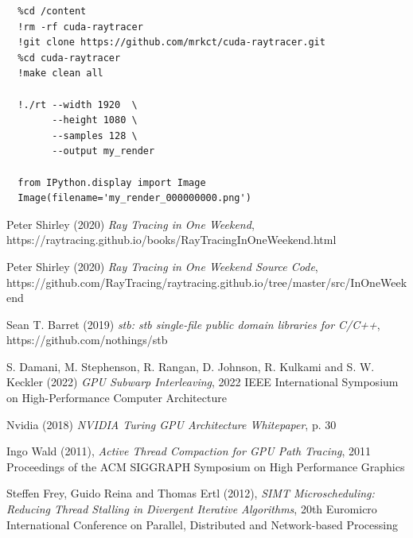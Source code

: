 \documentclass[12pt, twoside]{article}
\begin{document}
\begin{lstlisting}
  %cd /content
  !rm -rf cuda-raytracer
  !git clone https://github.com/mrkct/cuda-raytracer.git
  %cd cuda-raytracer
  !make clean all

  !./rt --width 1920  \
        --height 1080 \
        --samples 128 \
        --output my_render

  from IPython.display import Image
  Image(filename='my_render_000000000.png')
\end{lstlisting}

\newpage
\begin{thebibliography}{9}
    Peter Shirley (2020) \emph{Ray Tracing in One Weekend}, https://raytracing.github.io/books/RayTracingInOneWeekend.html

    Peter Shirley (2020) \emph{Ray Tracing in One Weekend Source Code}, https://github.com/RayTracing/raytracing.github.io/tree/master/src/InOneWeekend

    \bibitem{stb}
    Sean T. Barret (2019) \emph{stb: stb single-file public domain libraries for C/C++}, https://github.com/nothings/stb

    S. Damani, M. Stephenson, R. Rangan, D. Johnson, R. Kulkami and S. W. Keckler (2022) \emph{GPU Subwarp Interleaving}, 
    2022 IEEE International Symposium on High-Performance Computer Architecture

    \bibitem{2018rtcores}
    Nvidia (2018) \emph{NVIDIA Turing GPU Architecture Whitepaper}, p. 30

    Ingo Wald (2011), \emph{Active Thread Compaction for GPU Path Tracing}, 2011 Proceedings of the ACM SIGGRAPH Symposium on High Performance Graphics

    Steffen Frey, Guido Reina and Thomas Ertl (2012), \emph{SIMT Microscheduling: Reducing Thread Stalling in Divergent Iterative Algorithms}, 20th Euromicro International Conference on Parallel, Distributed and Network-based Processing
\end{thebibliography}
\end{document}
